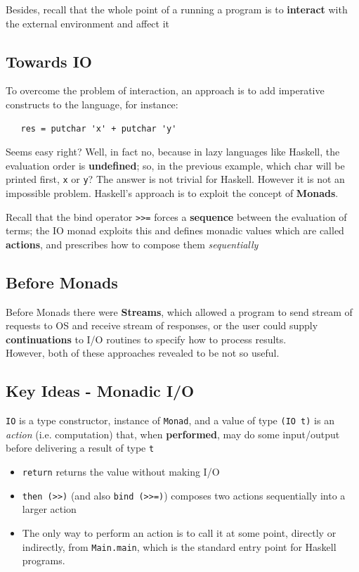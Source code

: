 Besides, recall that the whole point of a running a program is to \textbf{interact}
with the external environment and affect it

\subsection{Towards IO}
To overcome the problem of interaction, an approach is to add imperative constructs to the language,
for instance:
\begin{lstlisting}
   res = putchar 'x' + putchar 'y'
\end{lstlisting}
Seems easy right?
Well, in fact no, because in lazy languages like Haskell,
the evaluation order is \textbf{undefined};
so, in the previous example, which char will be printed first, \lstinline|x| or \lstinline|y|?
The answer is not trivial for Haskell.
However it is not an impossible problem.
Haskell's approach is to exploit the concept of \textbf{Monads}.

Recall that the bind operator \lstinline|>>=| forces a \textbf{sequence} between the evaluation of terms;
the IO monad exploits this and defines monadic values which are called \textbf{actions}, and prescribes how to compose
them \textit{sequentially}


\subsection*{Before Monads}
Before Monads there were \textbf{Streams}, which allowed a program to send stream of requests to OS and receive stream of responses,
or the user could supply \textbf{continuations} to I/O routines
to specify how to process results.\\
However, both of these approaches revealed to be not so useful.

\subsection{Key Ideas - Monadic I/O}

\lstinline|IO| is a type constructor, instance of \lstinline|Monad|, and a value of type \lstinline|(IO t)| is an
\textit{action} (i.e. computation) that, when \textbf{performed}, may do some
input/output before delivering a result of type \lstinline|t|
\begin{itemize}
   \item 
   \lstinline|return| returns the value without making I/O
   \item
   \lstinline|then (>>)| (and also \lstinline|bind (>>=)|) composes two
   actions sequentially into a larger action
   \item
   The only way to perform an action is to call it at
   some point, directly or indirectly, from
   \lstinline|Main.main|,
   which is the standard entry point for Haskell programs.
\end{itemize}

